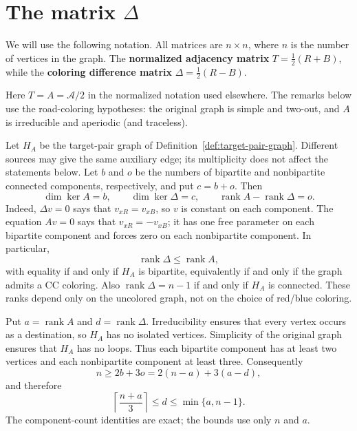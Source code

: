 


\section{The matrix $\Delta$}  %


We will use the following notation.  
All matrices are $n \times n$, where $n$ is the number of vertices in the graph. 
The \textbf{normalized adjacency matrix} $T= \frac{1}{2}(R+B)$, while the \textbf{coloring difference matrix} $\Delta= \frac{1}{2}(R-B)$.

Here $T=A=\mathcal A/2$ in the normalized notation used elsewhere.
The remarks below use the road-coloring hypotheses: the original graph is
simple and two-out, and $A$ is irreducible and aperiodic (and traceless).

\begin{remark}
\label{delta-rank:component-counts}
Let $H_A$ be the target-pair graph of Definition~\ref{def:target-pair-graph}. Different sources may give the same
auxiliary edge; its multiplicity does not affect the statements below.
Let $b$ and $o$ be the numbers of bipartite and nonbipartite connected
components, respectively, and put $c=b+o$. Then
\[
 \dim\ker A=b,\qquad \dim\ker\Delta=c,
 \qquad
 \operatorname{rank}A-\operatorname{rank}\Delta=o.
\]
Indeed, $\Delta v=0$ says that $v_{xR}=v_{xB}$, so $v$ is constant on
each component. The equation $Av=0$ says that $v_{xR}=-v_{xB}$; it
has one free parameter on each bipartite component and forces zero on
each nonbipartite component. In particular,
\[
 \operatorname{rank}\Delta\le\operatorname{rank}A,
\]
with equality if and only if $H_A$ is bipartite, equivalently if and only
if the graph admits a CC coloring. Also
$\operatorname{rank}\Delta=n-1$ if and only if $H_A$ is connected.
These ranks depend only on the uncolored graph, not on the choice of
red/blue coloring.
\end{remark}

\begin{remark}
\label{delta-rank:bounds}
Put $a=\operatorname{rank}A$ and $d=\operatorname{rank}\Delta$.
Irreducibility ensures that every vertex occurs as a destination, so
$H_A$ has no isolated vertices. Simplicity of the original graph ensures
that $H_A$ has no loops. Thus each bipartite component has at least two
vertices and each nonbipartite component at least three. Consequently
\[
 n\ge2b+3o=2(n-a)+3(a-d),
\]
and therefore
\[
 \boxed{\left\lceil\frac{n+a}{3}\right\rceil
 \le d\le\min\{a,n-1\}.}
\]
The component-count identities are exact; the bounds use only $n$ and $a$.
\end{remark}

